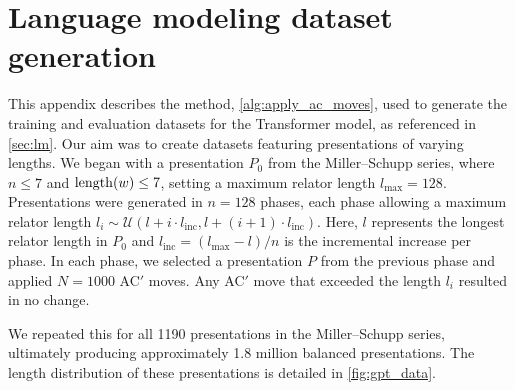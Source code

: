 
\section{Language modeling dataset generation \label{app:algorithm}}

This appendix describes the method, \cref{alg:apply_ac_moves}, used to generate the training and evaluation datasets for the Transformer model, as referenced in \cref{sec:lm}. Our aim was to create datasets featuring presentations of varying lengths. We began with a presentation \(P_0\) from the Miller--Schupp series, where $n \leq 7$ and $\operatorname{length}(w) \leq 7$, setting a maximum relator length \(l_{\text{max}} = 128\). Presentations were generated in \(n=128\) phases, each phase allowing a maximum relator length \(l_i \sim \mathcal{U}(l + i \cdot l_{\text{inc}}, l + (i+1) \cdot l_{\text{inc}})\). Here, \(l\) represents the longest relator length in \(P_0\) and \(l_{\text{inc}} = (l_{\text{max}} - l)/n\) is the incremental increase per phase. In each phase, we selected a presentation \(P\) from the previous phase and applied \(N=1000\) AC$'$ moves. Any AC$'$ move that exceeded the length \(l_i\) resulted in no change.

We repeated this for all 1190 presentations in the Miller--Schupp series, ultimately producing approximately 1.8 million balanced presentations. The length distribution of these presentations is detailed in \cref{fig:gpt_data}.

